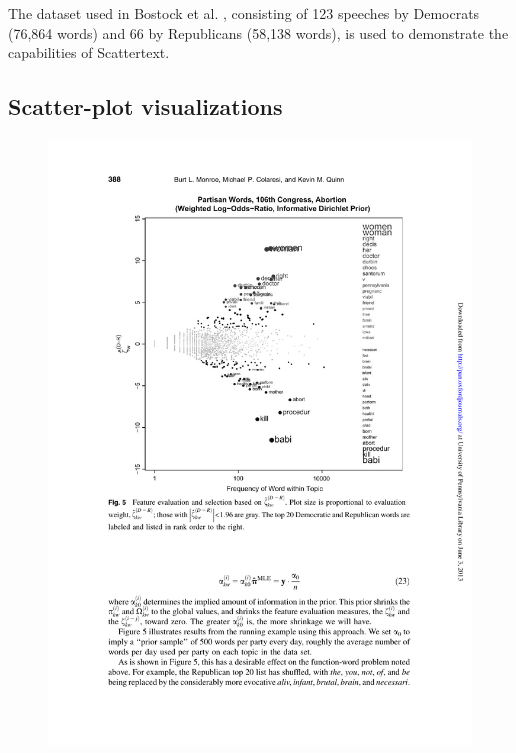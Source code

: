 \documentclass[11pt,a4paper]{article}
\begin{document}
The dataset used in Bostock et al. , consisting of 123 speeches by Democrats (76,864 words) and 66 by Republicans (58,138 words), is used to demonstrate the capabilities of Scattertext.  

\subsection{Scatter-plot visualizations}

\begin{figure}[h] 
\includegraphics[width=\columnwidth]{monroefull}

\end{figure}
\end{document}
